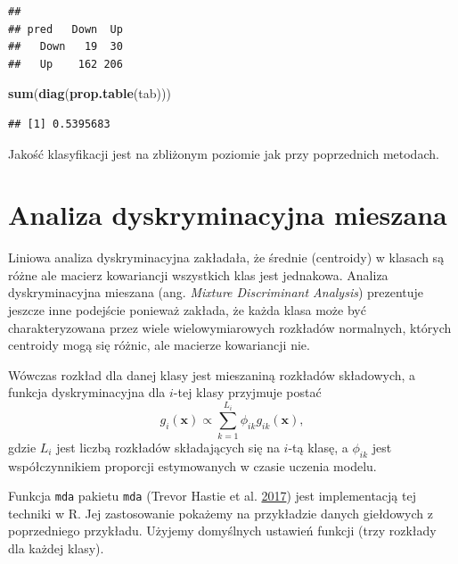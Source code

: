 \documentclass[]{book}
\newenvironment{Shaded}{\begin{snugshade}}{\end{snugshade}}
\newcommand{\KeywordTok}[1]{\textcolor[rgb]{0.13,0.29,0.53}{\textbf{#1}}}
\newcommand{\NormalTok}[1]{#1}
\theoremstyle{plain}
\theoremstyle{definition}
\theoremstyle{definition}
\theoremstyle{definition}
\theoremstyle{definition}
\theoremstyle{remark}
\let\BeginKnitrBlock\begin \let\EndKnitrBlock\end
\begin{document}
\begin{verbatim}
##       
## pred   Down  Up
##   Down   19  30
##   Up    162 206
\end{verbatim}

\begin{Shaded}
\begin{Highlighting}[]
\KeywordTok{sum}\NormalTok{(}\KeywordTok{diag}\NormalTok{(}\KeywordTok{prop.table}\NormalTok{(tab)))}
\end{Highlighting}
\end{Shaded}

\begin{verbatim}
## [1] 0.5395683
\end{verbatim}

Jakość klasyfikacji jest na zbliżonym poziomie jak przy poprzednich metodach.

\hypertarget{analiza-dyskryminacyjna-mieszana}{%
\section{Analiza dyskryminacyjna mieszana}\label{analiza-dyskryminacyjna-mieszana}}

Liniowa analiza dyskryminacyjna zakładała, że średnie (centroidy) w klasach są różne ale macierz kowariancji wszystkich klas jest jednakowa. Analiza dyskryminacyjna mieszana (ang. \emph{Mixture Discriminant Analysis}) prezentuje jeszcze inne podejście ponieważ zakłada, że każda klasa może być charakteryzowana przez wiele wielowymiarowych rozkładów normalnych, których centroidy mogą się różnic, ale macierze kowariancji nie.

Wówczas rozkład dla danej klasy jest mieszaniną rozkładów składowych, a funkcja dyskryminacyjna dla \(i\)-tej klasy przyjmuje postać
\begin{equation}
    g_i(\boldsymbol x)\propto \sum_{k=1}^{L_i}\phi_{ik}g_{ik}(\boldsymbol x),
\end{equation}
gdzie \(L_i\) jest liczbą rozkładów składających się na \(i\)-tą klasę, a \(\phi_{ik}\) jest współczynnikiem proporcji estymowanych w czasie uczenia modelu.

\BeginKnitrBlock{example}
\protect\hypertarget{exm:mda}{}{\label{exm:mda} }Funkcja \texttt{mda} pakietu \texttt{mda} (Trevor Hastie et al. \protect\hyperlink{ref-R-mda}{2017}) jest implementacją tej techniki w R. Jej zastosowanie pokażemy na przykładzie danych giełdowych z poprzedniego przykładu. Użyjemy domyślnych ustawień funkcji (trzy rozkłady dla każdej klasy).
\EndKnitrBlock{example}
\end{document}
